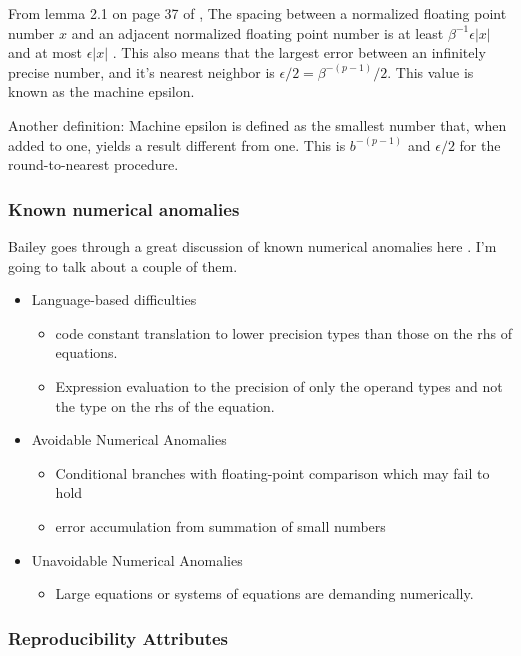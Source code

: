 \documentclass[american]{article}
\begin{document}
From lemma 2.1 on page 37 of \cite{higham-numerical-accuracy-and-stability}, The spacing between a normalized floating point number $x$ and an adjacent normalized floating point number is at least $\beta^{-1}\epsilon|x|$ and at most $\epsilon|x|$ \cite{higham-numerical-accuracy-and-stability}. This also means that the largest error between an infinitely precise number, and it's nearest neighbor is $\epsilon/2 = \beta^{-(p-1)}/2$. This value is known as the machine epsilon.

Another definition: Machine epsilon is defined as the smallest number that, when added to one, yields a result different from one. This is $b^{-(p-1)}$ and $\epsilon/2$ for the round-to-nearest procedure.

\subsubsection{Known numerical anomalies}

Bailey goes through a great discussion of known numerical anomalies here \cite{dhb-numerical-bugs}. I'm going to talk about a couple of them.

\begin{itemize}
\item Language-based difficulties
\begin{itemize}
\item code constant translation to lower precision types than those on the rhs of equations.
\item Expression evaluation to the precision of only the operand types and not the type on the rhs of the equation.
\end{itemize}
\item Avoidable Numerical Anomalies
\begin{itemize}
\item Conditional branches with floating-point comparison which may fail to hold
\item error accumulation from summation of small numbers
\end{itemize}
\item Unavoidable Numerical Anomalies
\begin{itemize}
\item Large equations or systems of equations are demanding numerically.
\end{itemize}
\end{itemize}

\subsubsection{Reproducibility Attributes}
\end{document}
